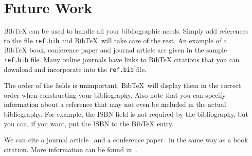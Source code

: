 \chapter{Future Work}
\label{chap:future}

\newcommand{\BibTeX}{Bib\TeX}

\BibTeX{} can be used to handle all your bibliographic needs.  Simply add
references to the file \texttt{ref.bib} and \BibTeX\ will take care of
the rest.  An example of a \BibTeX{} book, conference paper and journal
article are given in the sample \texttt{ref.bib} file.  Many online
journals have links to \BibTeX{} citations that you can download and
incorporate into the \texttt{ref.bib} file.

The order of the fields is unimportant. \BibTeX\ will display them
in the correct order when constructing your bibliography.  Also note
that you can specify information about a reference that may not even be
included in the actual bibliography.  For example, the ISBN field is not
required by the bibliography, but you can, if you want, put the ISBN to
the \BibTeX{} entry.

We can cite a journal article~\cite{someguy2002} and a conference
paper~\cite{LastName1996} in the same way as a book citation.  More
information can be found in~\cite{lam1994}.
